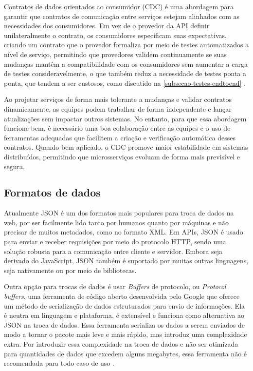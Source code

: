 Contratos de dados orientados ao consumidor (CDC) é uma abordagem para garantir que contratos de comunicação entre serviços estejam alinhados com as necessidades dos consumidores. Em vez de o provedor da API definir unilateralmente o contrato, os consumidores especificam suas expectativas, criando um contrato que o provedor formaliza por meio de testes automatizados a nível de serviço, permitindo que provedores validem continuamente se suas mudanças mantêm a compatibilidade com os consumidores sem aumentar a carga de testes consideravelmente, o que também reduz a necessidade de testes ponta a ponta, que tendem a ser custosos, como discutido na \autoref{subsecao-testes-endtoend} \cite{consumer-driven-contracts,livro-building-microservices}.

Ao projetar serviços de forma mais tolerante a mudanças e validar contratos dinamicamente, as equipes podem trabalhar de forma independente e lançar atualizações sem impactar outros sistemas. No entanto, para que essa abordagem funcione bem, é necessário uma boa colaboração entre as equipes e o uso de ferramentas adequadas que facilitem a criação e verificação automática desses contratos. Quando bem aplicado, o CDC promove maior estabilidade em sistemas distribuídos, permitindo que microsserviços evoluam de forma mais previsível e segura. \cite{consumer-driven-contracts}

\subsection{Formatos de dados}\label{subsecao-trocas-de-dados}
Atualmente JSON é um dos formatos mais populares para troca de dados na web, por ser facilmente lido tanto por humanos quanto por máquinas e não precisar de muitos metadados, como no formato XML. Em APIs, JSON é usado para enviar e receber requisições por meio do protocolo HTTP, sendo uma solução robusta para a comunicação entre cliente e servidor. Embora seja derivado do JavaScript, JSON também é suportado por muitas outras linguagens, seja nativamente ou por meio de bibliotecas. \cite{json_bourhis_2020}

Outra opção para trocas de dados é usar \emph{Buffers} de protocolo, ou \emph{Protocol buffers}, uma ferramenta de código aberto desenvolvida pelo Google que oferece um método de serialização de dados estruturados para envio de informações. Ela é neutra em linguagem e plataforma, é extensível e funciona como alternativa ao JSON na troca de dados. Essa ferramenta serializa os dados a serem enviados de modo a tornar o pacote mais leve e mais rápido, mas introduz uma complexidade extra. Por introduzir essa complexidade na troca de dados e não ser otimizada para quantidades de dados que excedem alguns megabytes, essa ferramenta não é recomendada para todo caso de uso \cite{google-protocol-buffers}.

